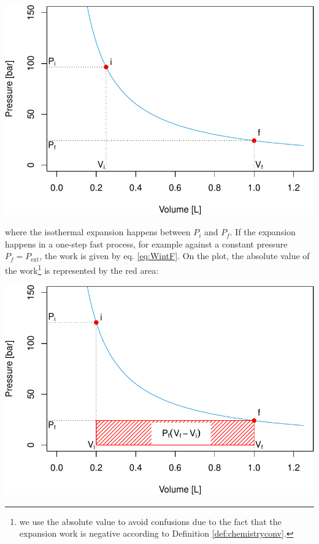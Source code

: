\documentclass[
]{book}
\theoremstyle{definition}
\theoremstyle{definition}
\theoremstyle{definition}
\theoremstyle{remark}
\begin{document}
\begin{center}\includegraphics{pchem1_files/figure-latex/unnamed-chunk-2-1} \end{center}

where the isothermal expansion happens between \(P_i\) and \(P_f\). If the expansion happens in a one-step fast process, for example against a constant pressure \(P_f=P_{\text{ext}}\), the work is given by eq. \eqref{eq:WintF}. On the plot, the absolute value of the work\footnote{we use the absolute value to avoid confusions due to the fact that the expansion work is negative according to Definition \ref{def:chemistryconv}.} is represented by the red area:

\begin{center}\includegraphics{pchem1_files/figure-latex/unnamed-chunk-3-1} \end{center}
\end{document}
